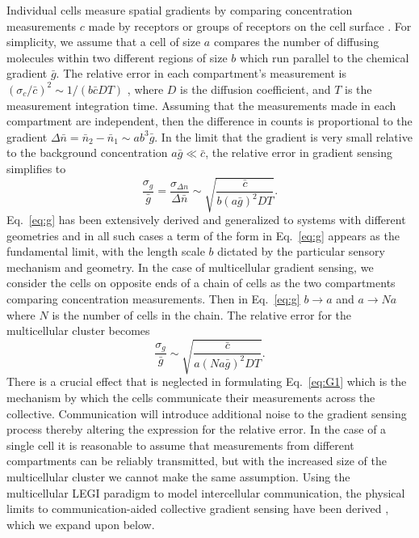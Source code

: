 Individual cells measure spatial gradients by comparing concentration measurements $c$ made by receptors or groups of receptors on the cell surface \cite{mugler2016limits,jilkine2011comparison}. For simplicity, we assume that a cell of size $a$ compares the number of diffusing molecules within two different regions of size $b$ which run parallel to the chemical gradient $\bar{g}$.
The relative error in each compartment's measurement is
$ \left(\sigma_c / \bar{c} \right)^2 \sim 1 / \left( b\bar{c}DT \right) $ \cite{berg1977physics},
where $D$ is the diffusion coefficient, and $T$ is the measurement integration time. Assuming that the measurements made in each compartment are independent, then the difference in counts is proportional to the gradient
$\Delta\bar{n} = \bar{n}_2 - \bar{n}_1 \sim ab^3\bar{g}$.
In the limit that the gradient is very small relative to the background concentration $a\bar{g}\ll\bar{c}$, the relative error in gradient sensing simplifies to
\begin{equation} \label{eq:g}
\frac{\sigma_g}{\bar{g}} = \frac{\sigma_{\Delta n}}{\Delta \bar{n}} \sim \sqrt{\frac{\bar{c}}{b(a\bar{g})^2DT}}.
\end{equation}
Eq.\ \ref{eq:g} has been extensively derived and generalized to systems with different geometries \cite{endres2008accuracy,endres2009accuracy,hu2010physical} and in all such cases a term of the form in Eq.\ \ref{eq:g} appears as the fundamental limit, with the length scale $b$ dictated by the particular sensory mechanism and geometry. In the case of multicellular gradient sensing, we consider the cells on opposite ends of a chain of cells as the two compartments comparing concentration measurements. Then in Eq.\ \ref{eq:g} $b \to a$ and $a \to Na$ where $N$ is the number of cells in the chain. The relative error for the multicellular cluster becomes \cite{mugler2016limits}
\begin{equation} \label{eq:G1}
\frac{\sigma_g}{\bar{g}} \sim \sqrt{\frac{\bar{c}}{a(Na\bar{g})^2DT}}.
\end{equation}
There is a crucial effect that is neglected in formulating Eq.\ \ref{eq:G1} which is the mechanism by which the cells communicate their measurements across the collective. Communication will introduce additional noise to the gradient sensing process thereby altering the expression for the relative error. In the case of a single cell it is reasonable to assume that measurements from different compartments can be reliably transmitted, but with the increased size of the multicellular cluster we cannot make the same assumption. Using the multicellular LEGI paradigm \cite{levchenko2002models} to model intercellular communication, the physical limits to communication-aided collective gradient sensing have been derived \cite{ellison2016cell, mugler2016limits}, which we expand upon below.

